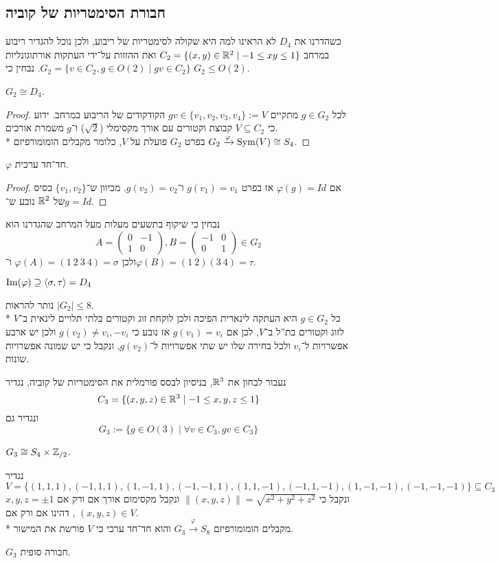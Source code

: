 \subsection{חבורת הסימטריות של קוביה}
כשהדרנו את $D_4$ לא הראינו למה היא שקולה לסימטריות של ריבוע, ולכן נוכל להגדיר ריבוע במרחב $C_2 = \{ (x, y) \in \mathbb{R}^2 \mid -1 \le xy \le 1 \}$
ואת ההזזות על־ידי העתקות אורתוגונליות $G_2 = \{ v \in C_2, g \in O(2) \mid gv \in C_2 \}$.
נבחין כי $G_2 \le O(2)$.
\begin{proposition}
	$G_2 \cong D_4$.
\end{proposition}
\begin{proof}
	לכל $g \in G_2$ מתקיים $gv \in \{v_1, v_2, v_3, v_4\} := V$ הקודקודים של הריבוע במרחב.
	ידוע כי $V \subseteq C_2$ קבוצת וקטורים עם אורך מקסימלי ($\sqrt{2}$) ו־$g$ משמרת אורכים. \\*
	בפרט $G_2$ פועלת על $V$, כלומר מקבלים הומומורפיזם $G_2 \xrightarrow{\varphi} \operatorname{Sym}(V) \cong S_4$.
\end{proof}
\begin{lemma}
	$\varphi$ חד־חד ערכית.
\end{lemma}
\begin{proof}
	אם $\varphi(g) = Id$ אז בפרט $g(v_1) = v_1$ ו־$g(v_2) = v_2$. מכיוון ש־$\{v_1, v_2\}$ בסיס של $\mathbb{R}^2$ נובע ש־$g = Id$.
\end{proof}
נבחין כי שיקוף בתשעים מעלות מעל המרחב שהגדרנו הוא
\[
	A = \begin{pmatrix}
		0 & -1 \\
		1 & 0
	\end{pmatrix},
	B = \begin{pmatrix}
		-1 & 0 \\
		0 & 1
	\end{pmatrix}
	\in G_2
\]
ולכן $\varphi(A) = (1\ 2\ 3\ 4) = \sigma$ ו־$\varphi(B) = (1\ 2)(3\ 4) = \tau$.
\begin{conclusion}
	$\operatorname{Im}(\varphi) \supseteq \langle \sigma, \tau \rangle = D_4$
\end{conclusion}
נותר להראות $|G_2| \le 8$. \\*
כל $g \in G_2$ היא העתקה לינארית הפיכה ולכן לוקחת זוג וקטורים בלתי תלויים לינאית ב־$V$ לזוג וקטורים בת''ל ב־$V$,
לכן אם $g(v_1) = v_i$ אז נובע כי $g(v_2) \ne v_i, -v_i$ ולכן יש ארבע אפשרויות ל־$v_i$ ולכל בחירה שלו יש שתי אפשרויות ל־$g(v_2)$, ונקבל כי יש שמונה אפשרויות שונות.

נעבור לבחון את $\mathbb{R}^3$, בניסיון לבסס פורמלית את הסימטריות של קוביה, נגדיר
\[
	C_3 = \{ (x, y, z) \in \mathbb{R}^3 \mid -1 \le x, y, z \le 1 \}
\]
ונגדיר גם
\[
	G_3 := \{ g \in O(3) \mid \forall v \in C_3, g v \in C_3 \}
\]
\begin{theorem}
	$G_3 \cong S_4 \times \mathbb{Z}_{/2}$.
\end{theorem}
נגדיר $V = \{ (1, 1, 1), (-1, 1, 1), (1, -1, 1), (-1, -1, 1), (1, 1, -1), (-1, 1, -1), (1, -1, -1), (-1, -1, -1)\} \subseteq C_3$
ונקבל כי $\lVert (x, y, z) \rVert = \sqrt{x^2 + y^2 + z^2}$ ונקבל מקסימום אורך אם ורק אם $x, y, z = \pm 1$, דהינו אם ורק אם $(x, y, z) \in V$. \\*
מקבלים הומומורפיזם $G_3 \xrightarrow{\varphi} S_8$ והוא חד־חד ערכי כי $V$ פורשת את המישור.
\begin{conclusion}
	$G_3$ חבורה סופית.
\end{conclusion}

